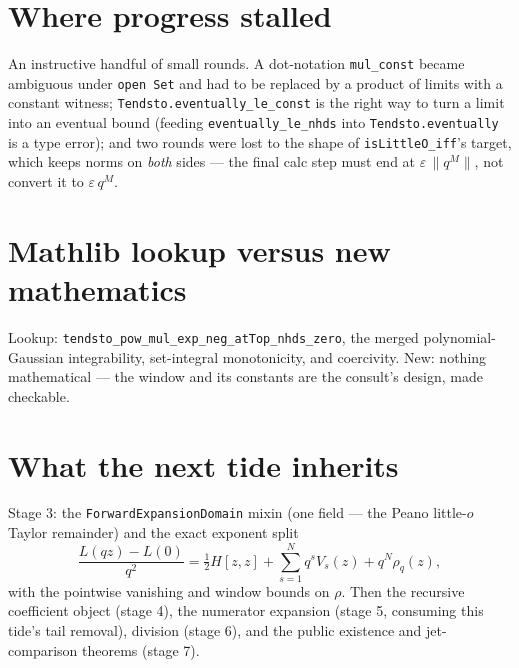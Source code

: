\documentclass[11pt]{article}
\newcommand{\code}[1]{\texttt{#1}}
\begin{document}
\section{Where progress stalled}

An instructive handful of small rounds. A dot-notation
\code{mul\_const} became ambiguous under \code{open Set} and had to
be replaced by a product of limits with a constant witness;
\code{Tendsto.eventually\_le\_const} is the right way to turn a
limit into an eventual bound (feeding \code{eventually\_le\_nhds}
into \code{Tendsto.eventually} is a type error); and two rounds were
lost to the shape of \code{isLittleO\_iff}'s target, which keeps
norms on \emph{both} sides --- the final calc step must end at
$\varepsilon\,\|q^M\|$, not convert it to $\varepsilon\,q^M$.

\section{Mathlib lookup versus new mathematics}

Lookup: \code{tendsto\_pow\_mul\_exp\_neg\_atTop\_nhds\_zero}, the
merged polynomial-Gaussian integrability, set-integral monotonicity,
and coercivity. New: nothing mathematical --- the window and its
constants are the consult's design, made checkable.

\section{What the next tide inherits}

Stage 3: the \code{ForwardExpansionDomain} mixin (one field --- the
Peano little-$o$ Taylor remainder) and the exact exponent split
\[
  \frac{L(qz) - L(0)}{q^2} = \tfrac12 H[z,z]
  + \sum_{s=1}^{N} q^s V_s(z) + q^N \rho_q(z),
\]
with the pointwise vanishing and window bounds on $\rho$. Then the
recursive coefficient object (stage 4), the numerator expansion
(stage 5, consuming this tide's tail removal), division (stage 6),
and the public existence and jet-comparison theorems (stage 7).
\end{document}

